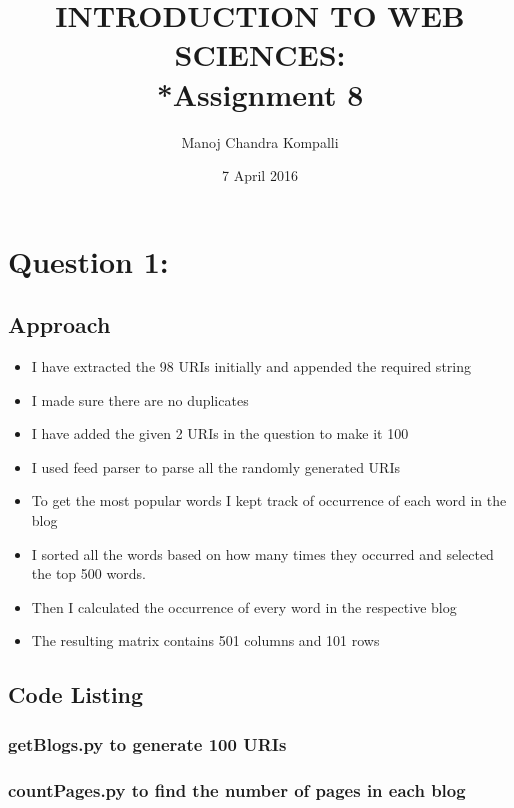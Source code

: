 \documentclass[12pt]{article}
\begin{document}
\begin{titlepage}
\title{INTRODUCTION TO WEB SCIENCES:\\*Assignment 8}
\author{Manoj Chandra Kompalli}
\date{7 April 2016}
\maketitle
\end{titlepage}

\tableofcontents
\newpage

\section{Question 1:  }


\subsection{Approach}
\begin{itemize}
\item I have extracted the 98 URIs initially and appended the required string 
\item I made sure there are no duplicates
\item I have added the given 2 URIs in the question to make it 100
\item I used feed parser to parse all the randomly generated URIs 
\item To get the most popular words I kept track of occurrence of each word in the blog
\item I sorted all the words based on how many times they occurred and selected the top 500 words.
\item Then I calculated the occurrence of every word in the respective blog
\item The resulting matrix contains 501 columns and 101 rows
\end{itemize}



 \newpage

\subsection{Code Listing}
\subsubsection{getBlogs.py to generate 100 URIs}

\newpage
\subsubsection{countPages.py to find the number of pages in each blog }

\newpage
\end{document}

